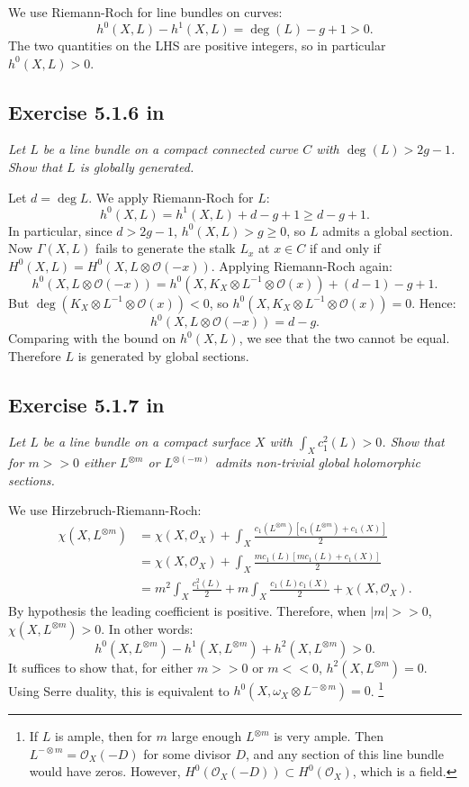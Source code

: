\documentclass{article}
\begin{document}
We use Riemann-Roch for line bundles on curves:
\[	h^0(X,L) - h^1(X,L) = \deg(L) - g + 1 > 0.	\]
The two quantities on the LHS are positive integers, so in particular $h^0(X,L) > 0$.



\subsection*{Exercise 5.1.6 in \cite{Huy}}
\emph{Let $L$ be a line bundle on a compact connected curve $C$ with $\deg(L)>2g-1$. Show that $L$ is globally generated.}
\vspace{3mm}

Let $d = \deg L$. We apply Riemann-Roch for $L$:
\[	h^0(X,L) = h^1(X,L) + d - g + 1 \geq d - g + 1. 	\]
In particular, since $d>2g-1$, $h^0(X,L) > g \geq 0$, so $L$ admits a global section. Now $\Gamma(X,L)$ fails to generate
the stalk $L_x$ at $x \in C$ if and only if $H^0(X,L) = H^0(X,L\otimes \mathcal{O}(-x))$. Applying Riemann-Roch
again:
\[	h^0(X,L\otimes \mathcal{O}(-x)) = h^0(X,K_X \otimes L^{-1} \otimes \mathcal{O}(x)) + (d-1) - g + 1.	\]
But $\deg (K_X \otimes L^{-1} \otimes \mathcal{O}(x)) < 0$, so $h^0(X,K_X \otimes L^{-1} \otimes \mathcal{O}(x)) = 0$.
Hence:
\[	h^0(X,L\otimes \mathcal{O}(-x)) = d - g.	\]
Comparing with the bound on $h^0(X,L)$, we see that the two cannot be equal. Therefore $L$ is generated by global sections.



\subsection*{Exercise 5.1.7 in \cite{Huy}}
\emph{Let $L$ be a line bundle on a compact surface $X$ with $\int_X c_1^2(L) > 0$. Show that for $m>>0$ either
$L^{\otimes m}$ or $L^{\otimes (-m)}$ admits non-trivial global holomorphic sections.}
\vspace{3mm}

We use Hirzebruch-Riemann-Roch:
\begin{align*}
\chi(X,L^{\otimes m}) &= \chi(X,\mathcal{O}_X) + \int_X \frac{c_1(L^{\otimes m}) [ c_1(L^{\otimes m}) + c_1(X) ]}{2} \\
&= \chi(X,\mathcal{O}_X) + \int_X \frac{mc_1(L)[mc_1(L) + c_1(X)]}{2} \\
&= m^2 \int_X \frac{c_1^2(L)}{2} + m \int_X \frac{c_1(L)c_1(X)}{2} + \chi(X,\mathcal{O}_X) .
\end{align*}
By hypothesis the leading coefficient is positive. Therefore, when $|m|>>0$, $\chi(X,L^{\otimes m}) > 0$. In other words:
\[	h^0(X,L^{\otimes m}) - h^1(X,L^{\otimes m}) + h^2(X,L^{\otimes m}) > 0.	\]
It suffices to show that, for either $m>>0$ or $m<<0$, $h^2(X,L^{\otimes m}) = 0$. Using Serre duality, this is equivalent
to $h^0(X,\omega_X \otimes L^{-\otimes m}) = 0$. \footnote{If $L$ is ample, then for $m$ large enough
$L^{\otimes m}$ is very ample. Then $L^{-\otimes m} = \mathcal{O}_X(-D)$ for some divisor $D$, and any section of this
line bundle would have zeros. However, $H^0(\mathcal{O}_X(-D)) \subset H^0(\mathcal{O}_X)$, which is a field.}
\end{document}
